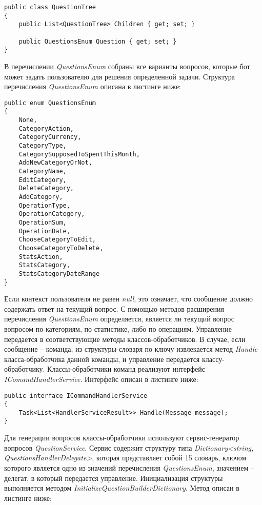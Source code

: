 \lstset{style=sharpc}
\begin{lstlisting}
public class QuestionTree
{
	public List<QuestionTree> Children { get; set; }

	public QuestionsEnum Question { get; set; }
}
\end{lstlisting}

В перечислении \emph{QuestionsEnum} собраны все варианты вопросов, которые бот может задать пользователю для решения определенной задачи. Структура перечисления \emph{QuestionsEnum} описана в листинге ниже:

\lstset{style=sharpc}
\begin{lstlisting}
public enum QuestionsEnum
{
	None,
	CategoryAction,
	CategoryCurrency,
	CategoryType,
	CategorySupposedToSpentThisMonth,
	AddNewCategoryOrNot,
	CategoryName,
	EditCategory,
	DeleteCategory,
	AddCategory,
	OperationType,
	OperationCategory,
	OperationSum,
	OperationDate,
	ChooseCategoryToEdit,
	ChooseCategoryToDelete,
	StatsAction,
	StatsCategory,
	StatsCategoryDateRange
}
\end{lstlisting}

Если контекст пользователя не равен \emph{null}, это означает, что сообщение должно содержать ответ на текущий вопрос. С помощью методов расширения перечисления \emph{QuestionsEnum} определяется, является ли текущий вопрос вопросом по категориям, по статистике, либо по операциям. Управление передается в соответствующие методы классов-обработчиков.
В случае, если сообщение – команда, из структуры-словаря по ключу извлекается метод \emph{Handle} класса-обработчика данной команды, и управление передается классу-обработчику.
Классы-обработчики команд реализуют интерфейс \emph{IComandHandlerService}. Интерфейс описан в листинге ниже:

\lstset{style=sharpc}
\begin{lstlisting}
public interface ICommandHandlerService
{
	Task<List<HandlerServiceResult>> Handle(Message message);
}
\end{lstlisting}

Для генерации вопросов классы-обработчики используют сервис-генератор вопросов \emph{QuestionService}. Сервис содержит структуру типа \emph{Dictionary<string, QuestionsHandlerDelegate>}, которая представляет собой
15
словарь, ключом которого является одно из значений перечисления \emph{QuestionsEnum}, значением – делегат, в который передается управление.
Инициализация структуры выполняется методом \emph{InitializeQuestionBuilderDictionary}. Метод описан в листинге ниже:

